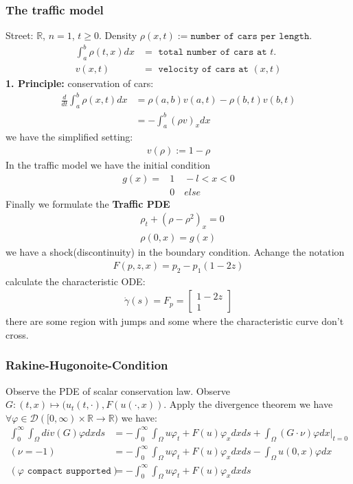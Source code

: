 \subsubsection*{The traffic model}
Street: $\mathbb{R}$, $n = 1$, $t \geq 0$. Density $\rho(x, t):= \texttt{number of cars per length}$. 
\begin{align*}
	\int_a^b \rho(t, x) dx &= \texttt{ total number of cars at $t$. }\\
	v(x, t) &= \texttt{ velocity of cars at } (x, t)
\end{align*}
\textbf{1. Principle:} conservation of cars:
\begin{align*}
	\frac{d}{dt} \int_a^b \rho(x, t)dx &= \rho(a, b) v(a, t) - \rho(b, t) v(b, t)\\
	&= - \int_a^b (\rho v)_x dx 
\end{align*}
we have the simplified setting:
\begin{align*}
	v(\rho):= 1 - \rho
\end{align*}
In the traffic model we have the initial condition
\begin{align*}
	g(x) = & 1 \quad - l < x < 0\\
	&0 \quad else
\end{align*}
Finally we formulate the \textbf{Traffic PDE}
\begin{align*}
	&\rho_t + (\rho - \rho^2)_x = 0\\
	&\rho(0, x)= g(x)
\end{align*}
we have a shock(discontinuity) in the boundary condition. Achange the notation
\begin{align*}
	F(p, z, x) = p_2 - p_1(1 - 2 z)
\end{align*}
calculate the characteristic ODE:
\begin{align*}
	\dot{\gamma}(s) = F_p = 
	\begin{bmatrix}
		1 - 2z\\
		1
	\end{bmatrix}
\end{align*}
there are some region with jumps and some where the characteristic curve don't cross. 

\subsubsection*{Rakine-Hugonoite-Condition}
Observe the PDE of scalar conservation law. Observe $G: (t, x) \mapsto (u_t(t, \cdot), F(u(\cdot, x))$.  Apply the divergence theorem we have $\forall \varphi \in \mathcal{D}([0, \infty) \times \mathbb{R} \rightarrow \mathbb{R})$ we have:
\begin{align*}
	\int_0^\infty\int_\Omega div(G) \varphi dx ds
	&= -\int_0^\infty\int_\Omega u \varphi_t + F(u) \varphi_x dx ds + \int_\Omega (G \cdot \nu) \varphi dx|_{t = 0} \\
	(\nu = -1)
	&= -\int_0^\infty\int_\Omega u \varphi_t + F(u) \varphi_x dxds - \int_\Omega u(0, x) \varphi dx\\
	(\varphi \texttt{ compact supported})
	&= -\int_0^\infty\int_\Omega u \varphi_t + F(u) \varphi_x dxds 
\end{align*}

